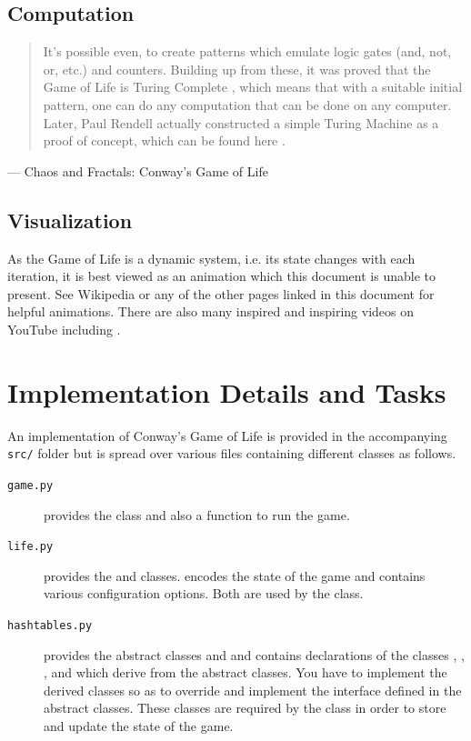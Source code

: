\documentclass[addpoints]{exam}
\begin{document}
\subsection{Computation}
\begin{quotation}
  It's possible even, to create patterns which emulate logic gates (and, not, or, etc.) and counters. Building up from these, it was proved that the Game of Life is Turing Complete \cite{wp_turing}, which means that with a suitable initial pattern, one can do any computation that can be done on any computer. Later, Paul Rendell actually constructed a simple Turing Machine as a proof of concept, which can be found here \cite{gol_turing}.
\end{quotation}
\raggedleft --- Chaos and Fractals: Conway's Game of Life \cite{chaos}
\justify

\subsection{Visualization}

As the Game of Life is a dynamic system, i.e. its state changes with each iteration, it is best viewed as an animation which this document is unable to present. See Wikipedia \cite{wp_gol} or any of the other pages linked in this document for helpful animations. There are also many inspired and inspiring videos on YouTube including \cite{yt_gol}.

\section{Implementation Details and Tasks}

An implementation of Conway's Game of Life is provided in the accompanying \texttt{src/} folder but is spread over various files containing different classes as follows.
\begin{description}
\item[\texttt{game.py}] provides the  class and also a  function to run the game.
\item[\texttt{life.py}] provides the  and  classes.  encodes the state of the game and  contains various configuration options. Both are used by the  class.
\item[\texttt{hashtables.py}] provides the abstract classes  and  and contains declarations of the classes , , , and  which derive from the abstract classes. You have to implement the derived classes so as to override and implement the interface defined in the abstract classes. These classes are required by the  class in order to store and update the state of the game.
\end{description}
\end{document}
